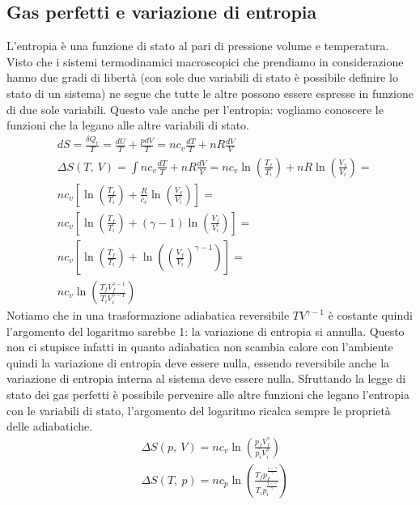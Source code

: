 \documentclass[10pt,a4paper]{article}
\begin{document}
\subsection{Gas perfetti e variazione di entropia}
L'entropia è una funzione di stato al pari di pressione volume e temperatura. Visto che i sistemi termodinamici macroscopici che prendiamo in considerazione hanno due gradi di libertà (con sole due variabili di stato è possibile definire lo stato di un sistema) ne segue che tutte le altre possono essere espresse in funzione di due sole variabili. Questo vale anche per l'entropia: vogliamo conoscere le funzioni che la legano alle altre variabili di stato. 
\begin{align*}
	&dS = \frac{\delta Q_r}{T} = \frac{dU}{T} + \frac{pdV}{T} = n c_v \frac{dT}{T}+nR\frac{dV}{V}\\
	&\Delta S(T,\ V) = \int n c_v \frac{dT}{T}+nR\frac{dV}{V} = nc_v\ln\left(\frac{T_f}{T_i}\right)+nR\ln\left(\frac{V_f}{V_i}\right)=\\
	&nc_v\left[\ln\left(\frac{T_f}{T_i}\right)+\frac{R}{c_v}\ln\left(\frac{V_f}{V_i}\right)\right]=\\
	&nc_v\left[\ln\left(\frac{T_f}{T_i}\right)+(\gamma-1)\ln\left(\frac{V_f}{V_i}\right)\right]=\\
	&nc_v\left[\ln\left(\frac{T_f}{T_i}\right)+\ln\left(\left(\frac{V_f}{V_i}\right)^{\gamma-1}\right)\right]=\\
	&nc_v\ln\left(\frac{T_fV_f^{\gamma-1}}{T_iV_i^{\gamma-1}}\right)
\end{align*}
Notiamo che in una trasformazione adiabatica reversibile \(TV^{\gamma-1}\) è costante quindi l'argomento del logaritmo sarebbe 1: la variazione di entropia si annulla. Questo non ci stupisce infatti in quanto adiabatica non scambia calore con l'ambiente quindi la variazione di entropia deve essere nulla, essendo reversibile anche la variazione di entropia interna al sistema deve essere nulla. Sfruttando la legge di stato dei gas perfetti è possibile pervenire alle altre funzioni che legano l'entropia con le variabili di stato, l'argomento del logaritmo ricalca sempre le proprietà delle adiabatiche.
\begin{align*}
	&\Delta S(p,\ V)=nc_v\ln\left(\frac{p_fV_f^{\gamma}}{p_iV_i^{\gamma}}\right)\\
	&\Delta S(T,\ p)=nc_p\ln\left(\frac{T_fp_f^{\frac{1-\gamma}{\gamma}}}{T_ip_i^{\frac{1-\gamma}{\gamma}}}\right)
\end{align*}
\end{document}

